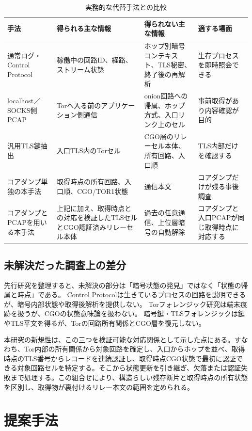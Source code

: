\documentclass[10pt,a4paper]{ltjsarticle}
\newcommand{\torone}{\textsc{TOR1}}
\begin{document}
\begin{table}[!tbp]
\centering
\caption{実務的な代替手法との比較}
\label{tab:practical-alternatives}
\small
\begin{tabularx}{\linewidth}{L{28mm}Y Y L{25mm}}
\toprule
手法 & 得られる主な情報 & 得られない主な情報 & 適する場面 \\
\midrule
通常ログ・Control Protocol & 稼働中の回路ID、経路、ストリーム状態 & ホップ別暗号コンテキスト、TLS秘密、終了後の再解析 & 生存プロセスを即時照会できる \\
localhost／SOCKS側PCAP~\cite{dfrws2026localtor} & Torへ入る前のアプリケーション側通信 & onion回路への帰属、ホップ方式、入口リンク上のセル & 事前取得があり内容確認が目的 \\
汎用TLS鍵抽出~\cite{moriconi2024xraytls,baier2024tlsmemory} & 入口TLS内のTorセル & CGO層のリレーセル本体、所有回路、入口順 & TLS内部だけを確認する \\
コアダンプ単独の本手法 & 取得時点の所有回路、入口順、CGO/\torone{}状態 & 通信本文 & コアダンプだけが残る事後調査 \\
コアダンプとPCAPを用いる本手法 & 上記に加え、取得時点との対応を検証したTLSセルとCGO認証済みリレーセル本体 & 過去の任意通信、上位層暗号の自動解除 & コアダンプと入口PCAPが同じ取得時点に対応する \\
\bottomrule
\end{tabularx}
\end{table}

\subsection{未解決だった調査上の差分}

先行研究を整理すると、未解決の部分は「暗号状態の発見」ではなく「状態の帰属と時点」である。
Control Protocolは生きているプロセスの回路を説明できるが、暗号内部状態や取得後解析を提供しない。
Torフォレンジック研究は端末痕跡を扱うが、CGOの状態意味論を扱わない。
暗号鍵・TLSフォレンジックは鍵やTLS平文を得るが、Torの回路所有関係とCGO層を復元しない。

本研究の新規性は、この三つを検証可能な対応関係として示した点にある。すなわち、Tor内部の所有関係から対象回路を確定し、入口からホップを並べ、取得時点のTLS番号からレコードを連続認証し、取得時点CGO状態で最初に認証できる対象回路セルを特定する。そこから状態更新を引き継ぎ、欠落または認証失敗まで処理する。この組合せにより、構造らしい残存断片と取得時点の所有状態を区別し、取得物が裏付けるリレー本文の範囲を定められる。

\section{提案手法}\label{sec:method}
\end{document}

